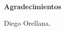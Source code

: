 \afterpage{\blankpage}
\newpage
{\LARGE \textbf{Agradecimientos}}\\[2cm]
\begin{center}
Diego Orellana.
\end{center}
